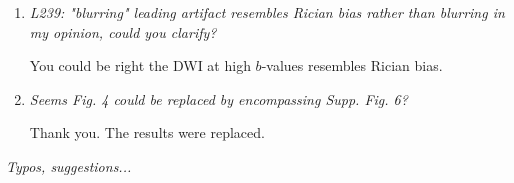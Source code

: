 \documentclass[a4paper,11pt,twoside]{report}
\begin{document}
\begin{enumerate}[resume]
    \item \textit{L239: "blurring" \textrightarrow leading artifact resembles Rician bias rather than blurring in my opinion, could you clarify?}

    \hspace{1em} You could be right the DWI at high $b$-values resembles Rician bias.

    \item \textit{Seems Fig. 4 could be replaced by encompassing Supp. Fig. 6?}

    \hspace{1em} Thank you. The results were replaced.

\end{enumerate}


\noindent \textit{Typos, suggestions...}
\end{document}
